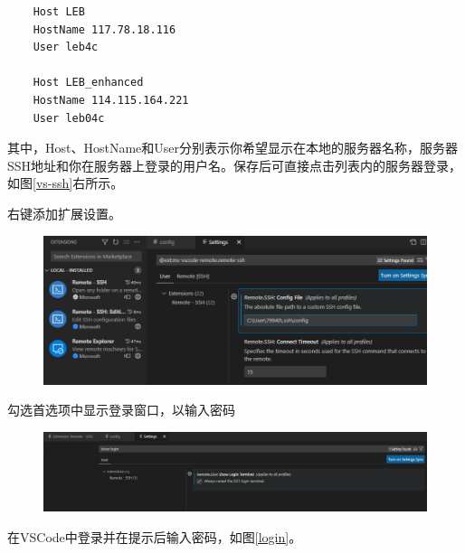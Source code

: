 \begin{lstlisting}
    Host LEB
    HostName 117.78.18.116
    User leb4c

    Host LEB_enhanced
    HostName 114.115.164.221
    User leb04c
\end{lstlisting}

其中，Host、HostName和User分别表示你希望显示在本地的服务器名称，服务器SSH地址和你在服务器上登录的用户名。保存后可直接点击列表内的服务器登录，如图\ref{vs-ssh}右所示。

右键添加扩展设置。
\begin{figure}[ht]
    \centering
    \includegraphics[width=13cm]{image/env/vs-ssh-plugin-set.png}
\end{figure}

勾选首选项中显示登录窗口，以输入密码
\begin{figure}[ht]
    \centering
    \includegraphics[width=13cm]{image/env/vs-remote-show-login.png}
\end{figure}

在VSCode中登录并在提示后输入密码，如图\ref{login}。

